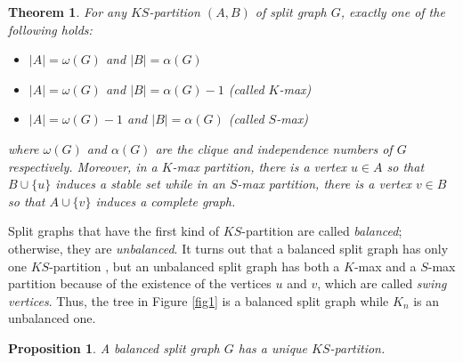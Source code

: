 \documentclass[11pt]{article}
\newtheorem{theorem}[df]{Theorem}
\newtheorem{proposition}[df]{Proposition}
\begin{document}
\begin{theorem}
{\bf \cite{HaSi81}} For any $KS$-partition $(A,B)$ of split graph $G$, exactly one of the following holds:
\begin{itemize}
\item $|A| = \omega(G)$ and $|B| = \alpha(G)$
\item $|A| = \omega(G)$ and $|B| = \alpha(G)-1$ (called $K$-max)
\item $|A| = \omega(G) -1$ and $|B| = \alpha(G)$ (called $S$-max)

\end{itemize}
where $\omega(G)$ and $\alpha(G)$ are the clique and independence numbers of $G$ respectively.  Moreover, in a $K$-max partition, there  is a vertex $u \in A$ so that $B \cup \{u\}$ induces a stable set while in an $S$-max partition, there is a vertex $v \in B$ so that $A \cup \{v\}$ induces a complete graph.  \end{theorem}

Split graphs that have the first kind of $KS$-partition are  called {\it balanced}; otherwise, they are {\it unbalanced}.  It turns out that a balanced split graph has only one $KS$-partition \cite{ChCoTr16},  but an unbalanced split graph has both a $K$-max and a $S$-max partition because of the existence of the vertices $u$ and $v$, which are called {\it swing vertices}.  Thus, the tree in Figure \ref{fig1} is a balanced split graph while $K_n$ is an unbalanced one.




\begin{proposition}
\label{uniqueKSprop}
{\bf \cite{ChCoTr16}} A balanced split graph $G$ has a unique $KS$-partition.  
\end{proposition}

	
	
	
\end{document}
